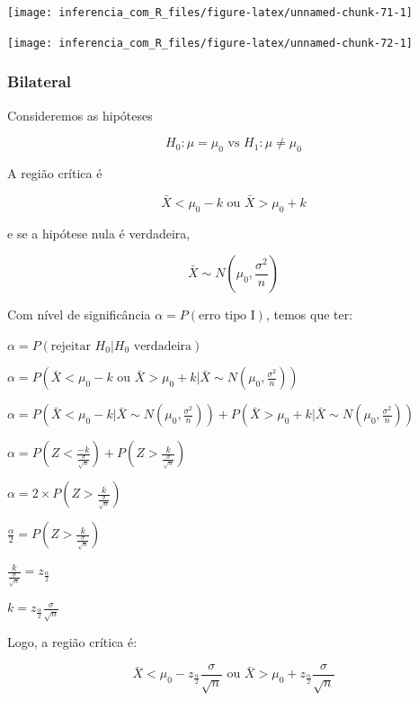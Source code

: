 \documentclass[
]{book}
\begin{document}
\begin{center}\texttt{[image: inferencia\_com\_R\_files/figure-latex/unnamed-chunk-71-1]} \end{center}

\begin{center}\texttt{[image: inferencia\_com\_R\_files/figure-latex/unnamed-chunk-72-1]} \end{center}

\hypertarget{bilateral}{%
\subsubsection{Bilateral}\label{bilateral}}

Consideremos as hipóteses

\[H_0:\mu=\mu_0 \text{  vs  } H_1:\mu\ne\mu_0\]

A região crítica é

\[\bar X < \mu_0-k\text{ ou }\bar X > \mu_0+k\]

e se a hipótese nula é verdadeira,

\[\bar X \sim N\left(\mu_0,\frac{\sigma^2}{n}\right)\]

Com nível de significância \(\alpha=P(\text{erro tipo I})\), temos que ter:

\(\alpha=P\left(\text{rejeitar }H_0|H_0\text{ verdadeira}\right)\)

\(\alpha=P\left(\bar X < \mu_0-k\text{ ou }\bar X > \mu_0+k|\bar X \sim N\left(\mu_0,\frac{\sigma^2}{n}\right)\right)\)

\(\alpha=P\left(\bar X < \mu_0-k|\bar X \sim N\left(\mu_0,\frac{\sigma^2}{n}\right)\right) + P\left(\bar X > \mu_0+k|\bar X \sim N\left(\mu_0,\frac{\sigma^2}{n}\right)\right)\)

\(\alpha=P\left(Z<\frac{-k}{\frac{\sigma}{\sqrt n}}\right)+P\left(Z>\frac{k}{\frac{\sigma}{\sqrt n}}\right)\)

\(\alpha=2\times P\left(Z>\frac{k}{\frac{\sigma}{\sqrt n}}\right)\)

\(\frac{\alpha}{2}=P\left(Z>\frac{k}{\frac{\sigma}{\sqrt n}}\right)\)

\(\frac{k}{\frac{\sigma}{\sqrt n}}=z_{\frac{\alpha}{2}}\)

\(k = z_{\frac{\alpha}{2}}\frac{\sigma}{\sqrt n}\)

Logo, a região crítica é:

\[\bar X < \mu_0-z_{\frac{\alpha}{2}}\frac{\sigma}{\sqrt n}\text{ ou }\bar X > \mu_0+z_{\frac{\alpha}{2}}\frac{\sigma}{\sqrt n}\]
\end{document}
